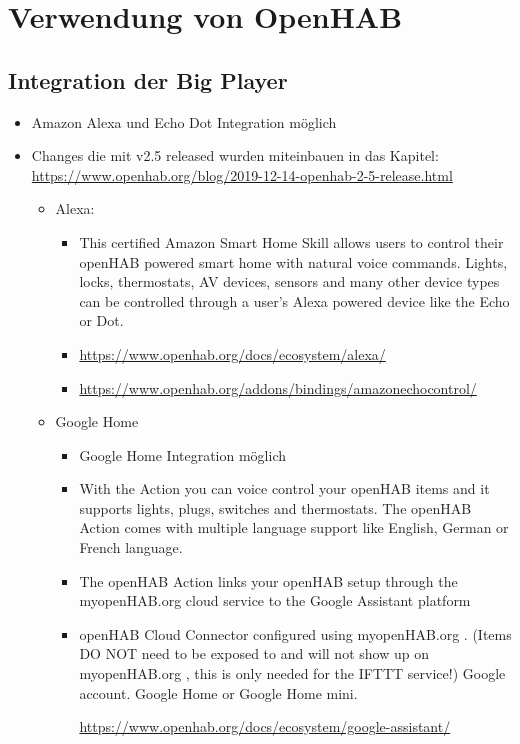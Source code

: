 \section{Verwendung von OpenHAB}
\subsection{Integration der Big Player}
\begin{itemize}
	\item Amazon Alexa und Echo Dot Integration möglich
	\item Changes die mit v2.5 released wurden miteinbauen in das Kapitel:
	\url{https://www.openhab.org/blog/2019-12-14-openhab-2-5-release.html}
	\begin{itemize}
		\item Alexa:
		\begin{itemize}
			\item This certified Amazon Smart Home Skill allows users to control their openHAB powered smart home with natural voice commands. Lights, locks, thermostats, AV devices, sensors and many other device types can be controlled through a user's Alexa powered device like the Echo or Dot.
			\item \url{https://www.openhab.org/docs/ecosystem/alexa/}
			\item \url{https://www.openhab.org/addons/bindings/amazonechocontrol/}
		\end{itemize} 
		\item Google Home
		\begin{itemize}
			\item Google Home Integration möglich
			\item With the Action you can voice control your openHAB items and it supports lights, plugs, switches and thermostats. The openHAB Action comes with multiple language support like English, German or French language.
			\item The openHAB Action links your openHAB setup through the myopenHAB.org cloud service to the Google Assistant platform
			\item openHAB Cloud Connector configured using myopenHAB.org . (Items DO NOT need to be exposed to and will not show up on myopenHAB.org
			, this is only needed for the IFTTT service!)
			Google account.
			Google Home or Google Home mini.
			
			\url{https://www.openhab.org/docs/ecosystem/google-assistant/}
		\end{itemize} 
	\end{itemize}
	
\end{itemize}


